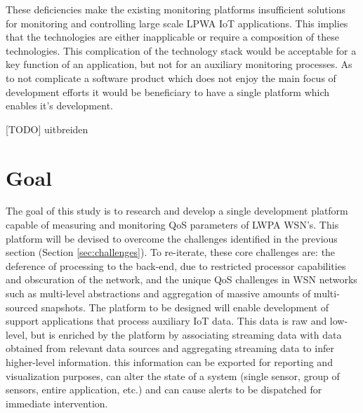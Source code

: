 These deficiencies make the existing monitoring platforms insufficient solutions for monitoring and controlling large scale LPWA IoT applications. This implies that the technologies are either inapplicable or require a composition of these technologies. This complication of the technology stack would be acceptable for a key function of an application, but not for an auxiliary monitoring processes. As to not complicate a software product which does not enjoy the main focus of development efforts it would be beneficiary to have a single platform which enables it's development.

[TODO] uitbreiden

\section{Goal}
\label{sec:goal}
The goal of this study is to research and develop a single development platform capable of measuring and monitoring QoS parameters of LWPA WSN's. This platform will be devised to overcome the challenges identified in the previous section (Section \ref{sec:challenges}). To re-iterate, these core challenges are: the deference of processing to the back-end, due to restricted processor capabilities and obscuration of the network, and the unique QoS challenges in WSN networks such as multi-level abstractions and aggregation of massive amounts of multi-sourced snapshots. The platform to be designed will enable development of support applications that process auxiliary IoT data. This data is raw and low-level, but is enriched by the platform by associating streaming data with data obtained from relevant data sources and aggregating streaming data to infer higher-level information. this information can be exported for reporting and visualization purposes, can alter the state of a system (single sensor, group of sensors, entire application, etc.) and can cause alerts to be dispatched for immediate intervention.

